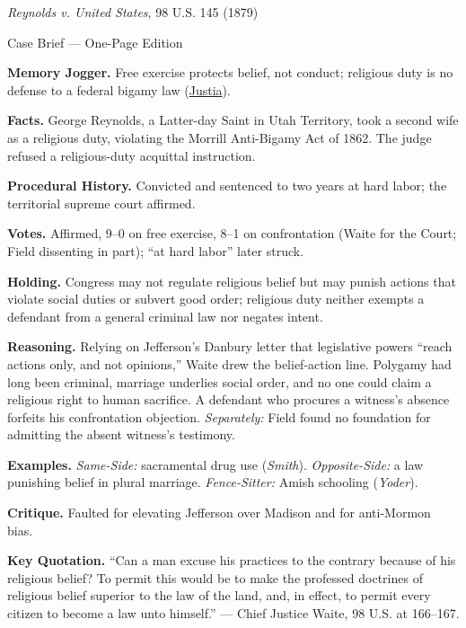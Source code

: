 \documentclass[12pt]{article}
\begin{document}
\begin{center}
{\Large \textit{Reynolds v. United States}, 98 U.S. 145 (1879)\par}
\vspace{0.3em}
{\normalsize Case Brief --- One-Page Edition\par}
\end{center}

\textbf{Memory Jogger.} Free exercise protects belief, not conduct; religious duty is no defense to a federal bigamy law (\href{https://supreme.justia.com/cases/federal/us/98/145/}{Justia}).

\textbf{Facts.} George Reynolds, a Latter-day Saint in Utah Territory, took a second wife as a religious duty, violating the Morrill Anti-Bigamy Act of 1862. The judge refused a religious-duty acquittal instruction.

\textbf{Procedural History.} Convicted and sentenced to two years at hard labor; the territorial supreme court affirmed.

\textbf{Votes.} Affirmed, 9--0 on free exercise, 8--1 on confrontation (Waite for the Court; Field dissenting in part); ``at hard labor'' later struck.

\textbf{Holding.} Congress may not regulate religious belief but may punish actions that violate social duties or subvert good order; religious duty neither exempts a defendant from a general criminal law nor negates intent.

\textbf{Reasoning.} Relying on Jefferson's Danbury letter that legislative powers ``reach actions only, and not opinions,'' Waite drew the belief-action line. Polygamy had long been criminal, marriage underlies social order, and no one could claim a religious right to human sacrifice. A defendant who procures a witness's absence forfeits his confrontation objection. \emph{Separately:} Field found no foundation for admitting the absent witness's testimony.

\textbf{Examples.} \emph{Same-Side:} sacramental drug use (\textit{Smith}). \emph{Opposite-Side:} a law punishing belief in plural marriage. \emph{Fence-Sitter:} Amish schooling (\textit{Yoder}).

\textbf{Critique.} Faulted for elevating Jefferson over Madison and for anti-Mormon bias.

\textbf{Key Quotation.} ``Can a man excuse his practices to the contrary because of his religious belief? To permit this would be to make the professed doctrines of religious belief superior to the law of the land, and, in effect, to permit every citizen to become a law unto himself.'' --- Chief Justice Waite, 98 U.S. at 166--167.
\end{document}
